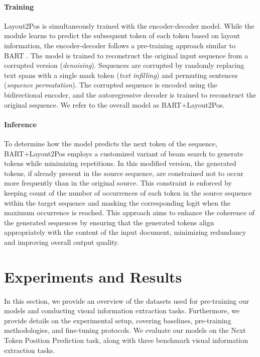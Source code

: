 \paragraph{Training} Layout2Pos is simultaneously trained with the encoder-decoder model. While the module learns to predict the subsequent token of each token based on layout information, the encoder-decoder follows a pre-training approach similar to \ac{BART}  \citep{lewis2006building}. The model is trained to reconstruct the original input sequence from a corrupted version (\textit{denoising}). Sequences are corrupted by randomly replacing text spans with a single mask token (\textit{text infilling}) and permuting sentences (\textit{sequence permutation}). The corrupted sequence is encoded using the bidirectional encoder, and the autoregressive decoder is trained to reconstruct the original sequence. We refer to the overall model as BART+Layout2Pos.

\paragraph{Inference} To determine how the model predicts the next token of the sequence, BART+Layout2Pos employs a customized variant of beam search to generate tokens while minimizing repetitions. In this modified version, the generated tokens, if already present in the source sequence, are constrained not to occur more frequently than in the original source. This constraint is enforced by keeping count of the number of occurrences of each token in the source sequence within the target sequence and masking the corresponding logit when the maximum occurrence is reached. This approach aims to enhance the coherence of the generated sequences by ensuring that the generated tokens align appropriately with the content of the input document, minimizing redundancy and improving overall output quality.


\section{Experiments and Results}

In this section, we provide an overview of the datasets used for pre-training our models and conducting visual information extraction tasks. Furthermore, we provide details on the experimental setup, covering baselines, pre-training methodologies, and fine-tuning protocols. We evaluate our models on the Next Token Position Prediction task, along with three benchmark visual information extraction tasks. 

